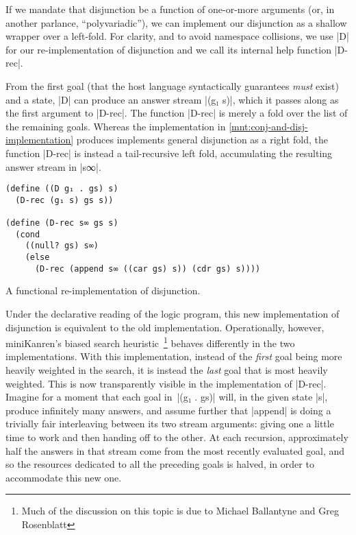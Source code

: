 \documentclass[sigplan,screen,draft,anonymous,review,natbib=false]{acmart}
\begin{document}
If we mandate that disjunction be a function of one-or-more arguments
(or, in another parlance, \enquote{polyvariadic}), we can implement
our disjunction as a shallow wrapper over a left-fold. For clarity,
and to avoid namespace collisions, we use \rackinline|D| for our
re-implementation of disjunction and we call its internal help
function \rackinline|D-rec|.

From the first goal (that the host language syntactically guarantees
\emph{must} exist) and a state, \rackinline|D| can produce an answer
stream \rackinline|(g₁ s)|, which it passes along as the first
argument to \rackinline|D-rec|. The function \rackinline|D-rec| is
merely a fold over the list of the remaining goals. Whereas the
implementation in \cref{mnt:conj-and-disj-implementation} produces
implements general disjunction as a right fold, the function
\rackinline|D-rec| is instead a tail-recursive left fold, accumulating
the resulting answer stream in \rackinline|s∞|.

\begin{listing}
  \begin{verbatim}
(define ((D g₁ . gs) s)
  (D-rec (g₁ s) gs s))

(define (D-rec s∞ gs s)
  (cond
    ((null? gs) s∞)
    (else
      (D-rec (append s∞ ((car gs) s)) (cdr gs) s))))
  \end{verbatim}
  \caption{A functional re-implementation of disjunction.}
  \label{mnt:disj-re-implementation}
\end{listing}

Under the declarative reading of the logic program, this new
implementation of disjunction is equivalent to the old implementation.
Operationally, however, miniKanren's biased search
heuristic~\footnote{Much of the discussion on this topic is due to
  Michael Ballantyne and Greg Rosenblatt} behaves differently in the
two implementations. With this implementation, instead of the
\emph{first} goal being more heavily weighted in the search, it is
instead the \emph{last} goal that is most heavily weighted. This is
now transparently visible in the implementation of \rackinline|D-rec|.
Imagine for a moment that each goal in~\rackinline|(g₁ . gs)| will, in
the given state \rackinline|s|, produce infinitely many answers, and
assume further that \rackinline|append| is doing a trivially fair
interleaving between its two stream arguments: giving one a little
time to work and then handing off to the other. At each recursion,
approximately half the answers in that stream come from the most
recently evaluated goal, and so the resources dedicated to all the
preceding goals is halved, in order to accommodate this new one.
\end{document}
